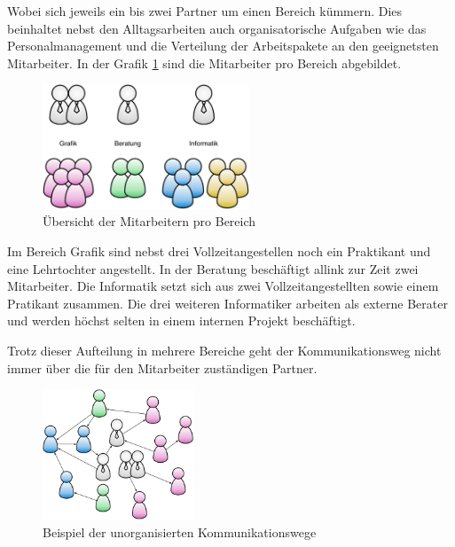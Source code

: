 Wobei sich jeweils ein bis zwei Partner um einen
Bereich kümmern. Dies beinhaltet nebst den Alltagsarbeiten auch organisatorische 
Aufgaben wie das Personalmanagement und die Verteilung der Arbeitspakete an den 
geeignetsten Mitarbeiter. In der Grafik \ref{pic:mitarbeiter_pro_bereich} 
sind die Mitarbeiter pro Bereich abgebildet.

\begin{figure}[htbp]
\begin{center}
\includegraphics[width=0.55\textwidth,angle=0]{./bilder/analyse/mitarbeiter_pro_bereich.pdf}
\caption{Übersicht der Mitarbeitern pro Bereich}
\label{pic:mitarbeiter_pro_bereich}
\end{center}
\end{figure}

Im Bereich Grafik sind nebst drei Vollzeitangestellen noch ein Praktikant und eine
Lehrtochter angestellt. In der Beratung beschäftigt allink zur Zeit zwei Mitarbeiter.
Die Informatik setzt sich aus zwei Vollzeitangestellten sowie einem Pratikant
zusammen. Die drei weiteren Informatiker arbeiten als externe Berater und
werden höchst selten in einem internen Projekt beschäftigt.

Trotz dieser Aufteilung in mehrere Bereiche geht der Kommunikationsweg nicht
immer über die für den Mitarbeiter zuständigen Partner. 

\begin{figure}[htbp]
\begin{center}
\includegraphics[width=0.40\textwidth,angle=0]{./bilder/analyse/kommunikationswege.pdf}
\caption{Beispiel der unorganisierten Kommunikationswege}
\label{pic:kommunikationswege}
\end{center}
\end{figure}

